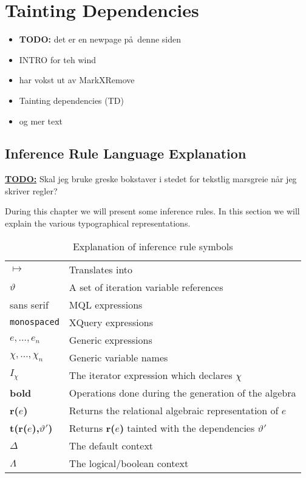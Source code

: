 \newpage
\section{Tainting Dependencies}
\label{sect:trans:taintingDependencies}

\begin{itemize}
  \item \textbf{\LARGE TODO:} det er en newpage p\aa~denne siden
  \item INTRO for teh wind
  \item har vokst ut av MarkXRemove
  \item Tainting dependencies (TD)
  \item og mer text
\end{itemize}

\subsection{Inference Rule Language Explanation}
\label{sect:trans:TD:langExpl}
\underline{\textbf{\LARGE TODO:}} Skal jeg bruke greske bokstaver i stedet for tekstlig marsgreie n\aa r jeg
skriver regler?

During this chapter we will present some inference rules. In this section we will explain the various
typographical representations.

\begin{table}[h]
\begin{tabular}{l|l}

  $\longmapsto$  			& Translates into \\
  $\vartheta$ 				& A set of iteration variable references \\
  \textsf{sans serif} 		& MQL expressions \\
  \texttt{monospaced} 		& XQuery expressions \\
  $e,\ldots,e_{n}$			& Generic expressions \\
  $\chi,\ldots,\chi_{n}$	& Generic variable names \\
  $I_{\chi}$				& The iterator expression which declares $\chi$ \\
  \textbf{bold} 			& Operations done during the generation of the algebra \\
  \textbf{r(}$e$\textbf{)} 	& Returns the relational algebraic representation of $e$   \\
  \textbf{t(}\textbf{r(}$e$\textbf{)}\textbf{,}$\vartheta'$\textbf{)} & Returns \textbf{r(}$e$\textbf{)} tainted
  with the dependencies $\vartheta'$ \\
  $\Delta$ 					&  The default context \\ 
  $\Lambda$ 				& The logical/boolean context \\
  
\end{tabular}
\caption{Explanation of inference rule symbols}
\label{tab:trans:td:langExpl}
\end{table}

